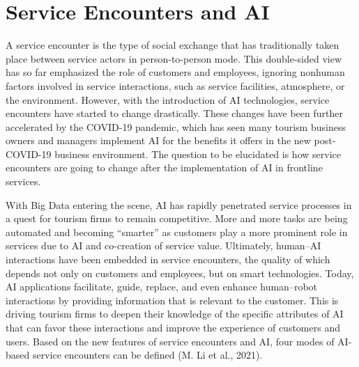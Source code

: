 \documentclass[
  letterpaper,
  DIV=11,
  numbers=noendperiod]{scrreprt}
\begin{document}
\hypertarget{service-encounters-and-ai}{%
\section{Service Encounters and AI}\label{service-encounters-and-ai}}

A service encounter is the type of social exchange that has
traditionally taken place between service actors in person-to-person
mode. This double-sided view has so far emphasized the role of customers
and employees, ignoring nonhuman factors involved in service
interactions, such as service facilities, atmosphere, or the
environment. However, with the introduction of AI technologies, service
encounters have started to change drastically. These changes have been
further accelerated by the COVID-19 pandemic, which has seen many
tourism business owners and managers implement AI for the benefits it
offers in the new post-COVID-19 business environment. The question to be
elucidated is how service encounters are going to change after the
implementation of AI in frontline services.

With Big Data entering the scene, AI has rapidly penetrated service
processes in a quest for tourism firms to remain competitive. More and
more tasks are being automated and becoming ``smarter'' as customers
play a more prominent role in services due to AI and co-creation of
service value. Ultimately, human--AI interactions have been embedded in
service encounters, the quality of which depends not only on customers
and employees, but on smart technologies. Today, AI applications
facilitate, guide, replace, and even enhance human--robot interactions
by providing information that is relevant to the customer. This is
driving tourism firms to deepen their knowledge of the specific
attributes of AI that can favor these interactions and improve the
experience of customers and users. Based on the new features of service
encounters and AI, four modes of AI-based service encounters can be
defined (M. Li et al., 2021).
\end{document}
